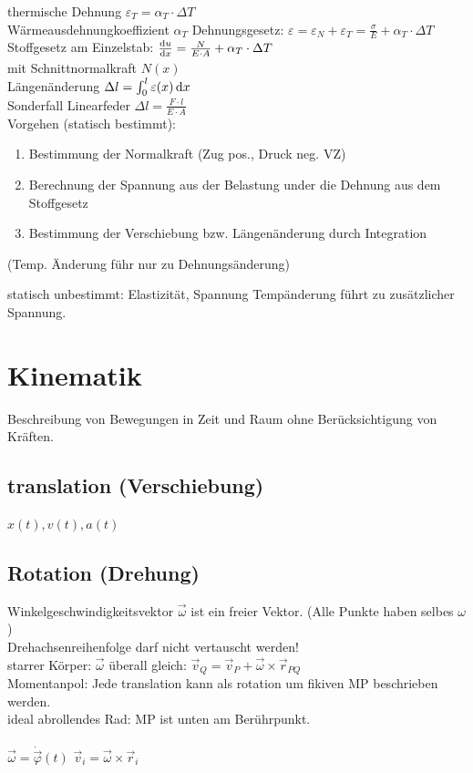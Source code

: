 \documentclass[fs, footer]{latex4ei}
\begin{document}
\begin{multicols}{4}
	thermische Dehnung $\varepsilon_T = \alpha_T \cdot \Delta T$\\
	Wärmeausdehnungkoeffizient $\alpha_T$
	Dehnungsgesetz: $\varepsilon = \varepsilon_N + \varepsilon_T = \frac{\sigma}{E} + \alpha_T \cdot \Delta T$\\
	
	Stoffgesetz am Einzelstab: $\frac{\diff u}{\diff x} = \frac{N}{E \cdot A} + \alpha_T \cdot \Delta T$\\
	mit Schnittnormalkraft $N(x)$\\
	Längenänderung $\Delta l = \int_0^l \varepsilon(x) \diff x$\\
	Sonderfall Linearfeder $\Delta l = \frac{F \cdot l}{E \cdot A}$\\


	Vorgehen (statisch bestimmt):\\
	\begin{enumerate}
		\item Bestimmung der Normalkraft (Zug pos., Druck neg. VZ)
		\item Berechnung der Spannung aus der Belastung under die Dehnung aus dem Stoffgesetz
		\item Bestimmung der Verschiebung bzw. Längenänderung durch Integration
	\end{enumerate}
	(Temp. Änderung führ nur zu Dehnungsänderung)

	statisch unbestimmt:
	Elastizität, Spannung 
	Tempänderung führt zu zusätzlicher Spannung.

\section{Kinematik}
Beschreibung von Bewegungen in Zeit und Raum ohne Berücksichtigung von Kräften.\\
\subsection{translation (Verschiebung)}
$x(t), v(t), a(t)$
\subsection{Rotation (Drehung)}
Winkelgeschwindigkeitsvektor $\vec \omega$ ist ein freier Vektor. (Alle Punkte haben selbes $\omega$)\\
Drehachsenreihenfolge darf nicht vertauscht werden! \\
starrer Körper: $\vec \omega$ überall gleich: $\vec v_Q = \vec v_P + \vec \omega \times \vec r_{PQ}$\\
Momentanpol: Jede translation kann als rotation um fikiven MP beschrieben werden.\\
ideal abrollendes Rad: MP ist unten am Berührpunkt.\\
 \\
$\vec \omega = \dot{\vec \varphi}(t)$ \qquad $\vec v_i = \vec \omega \times \vec r_i$\\



\end{multicols}
\end{document}
